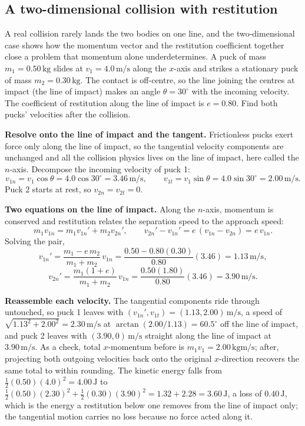 \subsection{A two-dimensional collision with restitution}

A real collision rarely lands the two bodies on one line, and the
two-dimensional case shows how the momentum vector and the restitution
coefficient together close a problem that momentum alone underdetermines.
A puck of mass $m_{1}=0.50\,\si{\kilogram}$ slides at $v_{1}=4.0\,\si{
\meter\per\second}$ along the $x$-axis and strikes a stationary puck of
mass $m_{2}=0.30\,\si{\kilogram}$. The contact is off-centre, so the
line joining the centres at impact (the line of impact) makes an angle
$\theta=30^{\circ}$ with the incoming velocity. The coefficient of
restitution along the line of impact is $e=0.80$. Find both pucks'
velocities after the collision.

\textbf{Resolve onto the line of impact and the tangent.} Frictionless
pucks exert force only along the line of impact, so the tangential
velocity components are unchanged and all the collision physics lives
on the line of impact, here called the $n$-axis. Decompose the incoming
velocity of puck 1:
\[
v_{1n}=v_{1}\cos\theta=4.0\cos 30^{\circ}=3.46\,\si{\meter\per\second},
\qquad
v_{1t}=v_{1}\sin\theta=4.0\sin 30^{\circ}=2.00\,\si{\meter\per\second}.
\]
Puck 2 starts at rest, so $v_{2n}=v_{2t}=0$.

\textbf{Two equations on the line of impact.} Along the $n$-axis,
momentum is conserved and restitution relates the separation speed to
the approach speed:
\[
m_{1}v_{1n}=m_{1}v_{1n}'+m_{2}v_{2n}', \qquad
v_{2n}'-v_{1n}'=e\,(v_{1n}-v_{2n})=e\,v_{1n}.
\]
Solving the pair,
\[
v_{1n}'=\frac{m_{1}-e\,m_{2}}{m_{1}+m_{2}}\,v_{1n}
=\frac{0.50-0.80(0.30)}{0.80}(3.46)=1.13\,\si{\meter\per\second},
\]
\[
v_{2n}'=\frac{m_{1}(1+e)}{m_{1}+m_{2}}\,v_{1n}
=\frac{0.50(1.80)}{0.80}(3.46)=3.90\,\si{\meter\per\second}.
\]

\textbf{Reassemble each velocity.} The tangential components ride
through untouched, so puck 1 leaves with $(v_{1n}',v_{1t})=(1.13,2.00)
\,\si{\meter\per\second}$, a speed of $\sqrt{1.13^{2}+2.00^{2}}=2.30
\,\si{\meter\per\second}$ at $\arctan(2.00/1.13)=60.5^{\circ}$ off the
line of impact, and puck 2 leaves with $(3.90,0)\,\si{\meter\per\second}$
straight along the line of impact at $3.90\,\si{\meter\per\second}$. As
a check, total $x$-momentum before is $m_{1}v_{1}=2.00\,\si{\kilogram
\meter\per\second}$; after, projecting both outgoing velocities back
onto the original $x$-direction recovers the same total to within
rounding. The kinetic energy falls from $\tfrac{1}{2}(0.50)(4.0)^{2}=
4.00\,\si{\joule}$ to $\tfrac{1}{2}(0.50)(2.30)^{2}+\tfrac{1}{2}(0.30)
(3.90)^{2}=1.32+2.28=3.60\,\si{\joule}$, a loss of $0.40\,\si{\joule}$,
which is the energy a restitution below one removes from the line of
impact only; the tangential motion carries no loss because no force
acted along it.

